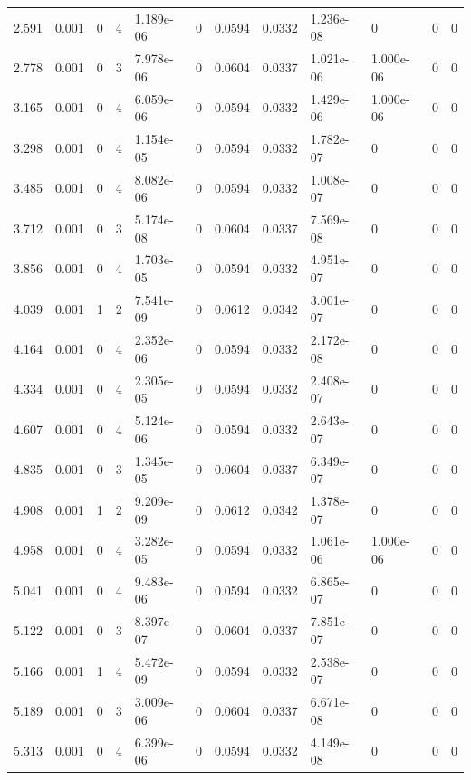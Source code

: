 \documentclass[preview]{standalone}
\begin{document}
{{\begin{tabular}{L{1.2cm}C{1.2cm} C{0.3cm}C{0.5cm} C{1.4cm}C{1.4cm} C{1.4cm}C{1.4cm} C{1.6cm}C{1.6cm} C{1.6cm}C{1.6cm}}
  2.591  &  0.001  & 0     &  4 &  1.189e-06  & 0  &  0.0594&   0.0332& 1.236e-08 & 0   &  0 & 0  \\ 
  2.778  &  0.001  & 0     &  3 &  7.978e-06  & 0  &  0.0604&   0.0337& 1.021e-06 & 1.000e-06   &  0 & 0  \\ 
  3.165  &  0.001  & 0     &  4 &  6.059e-06  & 0  &  0.0594&   0.0332& 1.429e-06 & 1.000e-06   &  0 & 0  \\ 
  3.298  &  0.001  & 0     &  4 &  1.154e-05  & 0  &  0.0594&   0.0332& 1.782e-07 & 0   &  0 & 0  \\ 
  3.485  &  0.001  & 0     &  4 &  8.082e-06  & 0  &  0.0594&   0.0332& 1.008e-07 & 0   &  0 & 0  \\ 
  3.712  &  0.001  & 0     &  3 &  5.174e-08  & 0  &  0.0604&   0.0337& 7.569e-08 & 0   &  0 & 0  \\ 
  3.856  &  0.001  & 0     &  4 &  1.703e-05  & 0  &  0.0594&   0.0332& 4.951e-07 & 0   &  0 & 0  \\ 
  4.039  &  0.001  & 1     &  2 &  7.541e-09  & 0  &  0.0612&   0.0342& 3.001e-07 & 0   &  0 & 0  \\ 
  4.164  &  0.001  & 0     &  4 &  2.352e-06  & 0  &  0.0594&   0.0332& 2.172e-08 & 0   &  0 & 0  \\ 
  4.334  &  0.001  & 0     &  4 &  2.305e-05  & 0  &  0.0594&   0.0332& 2.408e-07 & 0   &  0 & 0  \\ 
  4.607  &  0.001  & 0     &  4 &  5.124e-06  & 0  &  0.0594&   0.0332& 2.643e-07 & 0   &  0 & 0  \\ 
  4.835  &  0.001  & 0     &  3 &  1.345e-05  & 0  &  0.0604&   0.0337& 6.349e-07 & 0   &  0 & 0  \\ 
  4.908  &  0.001  & 1     &  2 &  9.209e-09  & 0  &  0.0612&   0.0342& 1.378e-07 & 0   &  0 & 0  \\ 
  4.958  &  0.001  & 0     &  4 &  3.282e-05  & 0  &  0.0594&   0.0332& 1.061e-06 & 1.000e-06   &  0 & 0  \\ 
  5.041  &  0.001  & 0     &  4 &  9.483e-06  & 0  &  0.0594&   0.0332& 6.865e-07 & 0   &  0 & 0  \\ 
  5.122  &  0.001  & 0     &  3 &  8.397e-07  & 0  &  0.0604&   0.0337& 7.851e-07 & 0   &  0 & 0  \\ 
  5.166  &  0.001  & 1     &  4 &  5.472e-09  & 0  &  0.0594&   0.0332& 2.538e-07 & 0   &  0 & 0  \\ 
  5.189  &  0.001  & 0     &  3 &  3.009e-06  & 0  &  0.0604&   0.0337& 6.671e-08 & 0   &  0 & 0  \\ 
  5.313  &  0.001  & 0     &  4 &  6.399e-06  & 0  &  0.0594&   0.0332& 4.149e-08 & 0   &  0 & 0  \\ 

\end{tabular}}}
\end{document}
